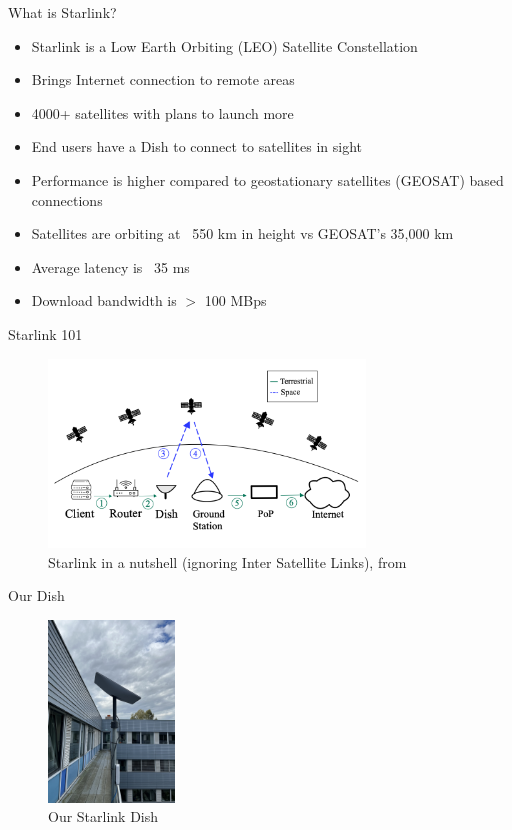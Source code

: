 \documentclass[NET,english,beameralt]{tumbeamer}
\begin{document}
\begin{frame}{What is Starlink?}
	\begin{itemize}
		\item Starlink is a Low Earth Orbiting (LEO) Satellite Constellation
		\item Brings Internet connection to remote areas 
		\item 4000+ satellites with plans to launch more
		\item End users have a Dish to connect to satellites in sight
		\item Performance is higher compared to geostationary satellites (GEOSAT) based connections
        \item Satellites are orbiting at ~550 km in height vs GEOSAT's 35,000 km
		\item Average latency is ~35 ms
        \item Download bandwidth is $>$ 100 MBps
	\end{itemize}
\end{frame}

\begin{frame}{Starlink 101}
	\begin{figure}
    	\includegraphics[width=0.75\textwidth]{pics/starlink-101.png}
    	\caption{Starlink in a nutshell (ignoring Inter Satellite Links), from \cite{izhikevich2023democratizing}}
	\end{figure}
\end{frame}

\begin{frame}{Our Dish}
	\begin{figure}
    	\includegraphics[width=0.3\textwidth]{pics/dish.jpeg}
    	\caption{Our Starlink Dish}
	\end{figure}
\end{frame}
\end{document}
